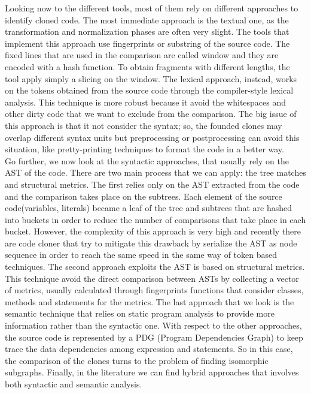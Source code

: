 Looking now to the different tools, most of them rely on different approaches to identify cloned code. The most immediate approach is the textual one, as the transformation and normalization phases are often very slight. The tools that implement this approach use fingerprints or substring of the source code. The fixed lines that are used in the comparison are called window and they are encoded with a hash function. To obtain fragments with different lengths, the tool apply simply a slicing on the window. The lexical approach, instead, works on the tokens obtained from the source code through the compiler-style lexical analysis. This technique is more robust because it avoid the whitespaces and other dirty code that we want to exclude from the comparison. The big issue of this approach is that it not consider the syntax; so, the founded clones may overlap different syntax units but preprocessing or postprocessing can avoid this situation, like pretty-printing techniques to format the code in a better way.\\
 Go further, we now look at the syntactic approaches, that usually rely on the AST of the code. There are two main process  that we can apply: the tree matches and structural metrics. The first relies only on the AST extracted from the code and the comparison takes place on the subtrees. Each element of the source code(variables, literals) became a leaf of the tree and subtrees that are hashed into buckets in order to reduce the number of comparisons that take place in each bucket. However, the complexity of this approach is very high and recently there are code cloner that try to mitigate this drawback by serialize the AST as node sequence in order to reach the same speed in the same way of  token based techniques. The second approach  exploits the AST is based on structural metrics. This technique avoid the direct comparison between ASTs by collecting a vector of metrics, usually calculated through fingerprints functions that consider classes, methods and statements for the metrics. The last approach that we look is the semantic technique that relies on static program analysis to provide more information rather than the syntactic one. With respect to the other approaches, the source code is represented by a PDG (Program Dependencies Graph) to keep trace the data dependencies among expression and statements. So in this case, the comparison of the clones turns to the problem of finding isomorphic subgraphs. Finally, in the literature we can find hybrid approaches that involves both syntactic and semantic analysis. \\
